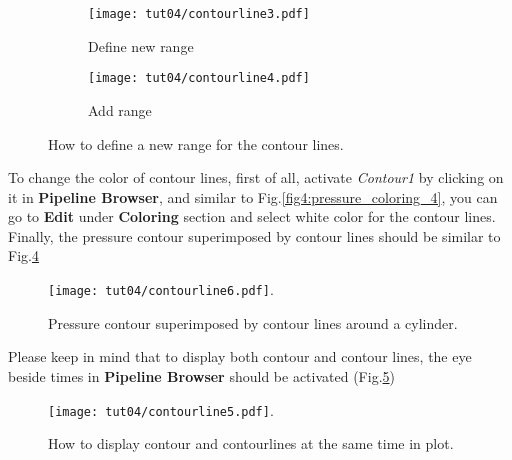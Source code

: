 \begin{figure}[htbp]
    \centering
    \begin{subfigure}[b]{.4\textwidth}
        \centering
        \texttt{[image: tut04/contourline3.pdf]}
        \caption{Define new range}
        \label{fig4:contourby_4 a}
    \end{subfigure}
    \hfill
    \begin{subfigure}[b]{.4\textwidth}
        \centering
        \texttt{[image: tut04/contourline4.pdf]}
        \caption{Add range}
        \label{fig4:contourby_4 b}
    \end{subfigure}     
    \caption{How to define a new range for the contour lines.}
    \label{fig4:contourby_4}
\end{figure}

To change the color of contour lines, first of all, activate \textit{Contour1} by clicking on it in \textbf{Pipeline Browser}, and similar to Fig.\ref{fig4:pressure_coloring_4}, you can go to \textbf{Edit} under \textbf{Coloring} section and select white color for the contour lines. Finally, the pressure contour superimposed by contour lines should be similar to Fig.\ref{fig4:contourline6_4}
\begin{figure}[htbp]
    \centering
    \texttt{[image: tut04/contourline6.pdf]}.
    \caption{Pressure contour superimposed by contour lines around a cylinder.}
    \label{fig4:contourline6_4}
\end{figure}
Please keep in mind that to display both contour and contour lines, the eye beside times in \textbf{Pipeline Browser} should be activated (Fig.\ref{fig4:contourline5_4})
\begin{figure}[htbp]
    \centering
    \texttt{[image: tut04/contourline5.pdf]}.
    \caption{How to display contour and contourlines at the same time in plot.}
    \label{fig4:contourline5_4}
\end{figure}

